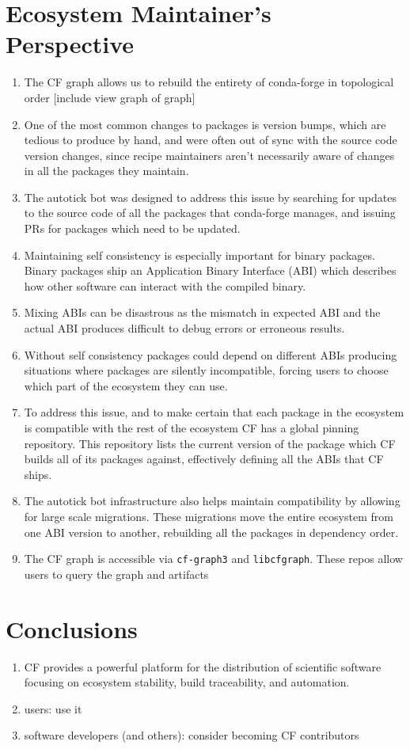 \documentclass[fleqn,10pt,lineno]{wlpeerj} %
\newcounter{saveenumi}
\newcommand{\seti}{\setcounter{saveenumi}{\value{enumi}}}
\newcommand{\conti}{\setcounter{enumi}{\value{saveenumi}}}
\begin{document}
\section*{Ecosystem Maintainer's Perspective}
\begin{enumerate}\conti
\item The CF graph allows us to rebuild the entirety of conda-forge in
topological order [include view graph of graph]
\item One of the most common changes to packages is version bumps, which are
tedious to produce by hand, and were often out of sync with the source code
version changes, since recipe maintainers aren't necessarily aware of 
changes in all the packages they maintain.
\item The autotick bot was designed to address this issue by searching for
updates to the source code of all the packages that conda-forge manages,
and issuing PRs for packages which need to be updated.
\item Maintaining self consistency is especially important for binary packages.
Binary packages ship an Application Binary Interface (ABI) which describes how other software
can interact with the compiled binary.
\item Mixing ABIs can be disastrous as the mismatch in expected ABI and 
the actual ABI produces difficult to debug errors or erroneous results.
\item Without self consistency packages could depend on different ABIs
producing situations where packages are silently incompatible, forcing
users to choose which part of the ecosystem they can use.
\item To address this issue, and to make certain that each package in the 
ecosystem is compatible with the rest of the ecosystem CF has a global 
pinning repository.
This repository lists the current version of the package which CF builds
all of its packages against, effectively defining all the ABIs that CF ships.
\item The autotick bot infrastructure also helps maintain compatibility by
allowing for large scale migrations. These migrations move the entire ecosystem
from one ABI version to another, rebuilding all the packages in dependency
order.
\item The CF graph is accessible via \texttt{cf-graph3} and \texttt{libcfgraph}.
These repos allow users to query the graph and artifacts
\end{enumerate}\seti


\section*{Conclusions}
\begin{enumerate}\conti
\item CF provides a powerful platform for the distribution of scientific
software focusing on ecosystem stability, build traceability, and automation.
\item users: use it
\item software developers (and others): consider becoming CF contributors
\end{enumerate}\seti
\end{document}
